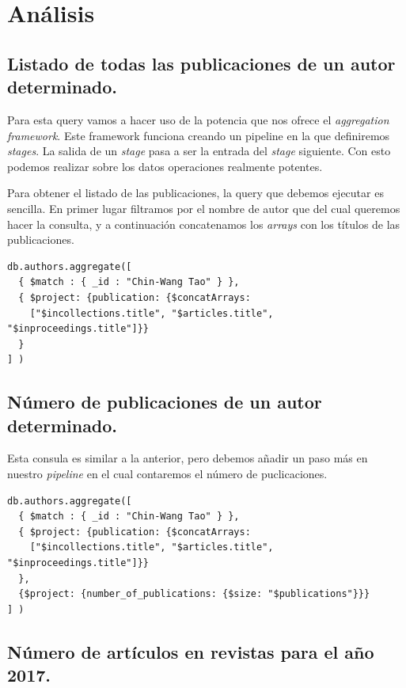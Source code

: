 \section{Análisis}

\subsection{Listado de todas las publicaciones de un autor determinado.}

Para esta query vamos a hacer uso de la potencia que nos ofrece el \textit{aggregation framework}. Este framework funciona creando un pipeline en la que definiremos \textit{stages}. La salida de un \textit{stage} pasa a ser la entrada del \textit{stage} siguiente. Con esto podemos realizar sobre los datos operaciones realmente potentes.

Para obtener el listado de las publicaciones, la query que debemos ejecutar es sencilla. En primer lugar filtramos por el nombre de autor que del cual queremos hacer la consulta, y a continuación concatenamos los \textit{arrays} con los títulos de las publicaciones.

\begin{verbatim}
db.authors.aggregate([
  { $match : { _id : "Chin-Wang Tao" } }, 
  { $project: {publication: {$concatArrays: 
    ["$incollections.title", "$articles.title", "$inproceedings.title"]}}
  }
] )
\end{verbatim}

\subsection{Número de publicaciones de un autor determinado.}

Esta consula es similar a la anterior, pero debemos añadir un paso más en nuestro \textit{pipeline} en el cual contaremos el número de puclicaciones.

\begin{verbatim}
db.authors.aggregate([
  { $match : { _id : "Chin-Wang Tao" } }, 
  { $project: {publication: {$concatArrays: 
    ["$incollections.title", "$articles.title", "$inproceedings.title"]}}
  },
  {$project: {number_of_publications: {$size: "$publications"}}}
] )
\end{verbatim}

\subsection{Número de artículos en revistas para el año 2017.}


